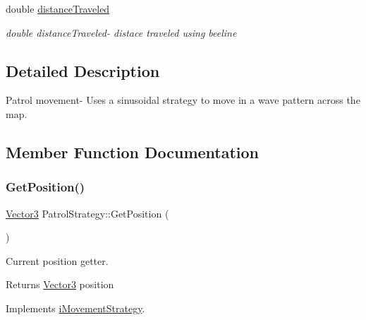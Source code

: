 \begin{DoxyCompactItemize}
\mbox{\label{classPatrolStrategy_a892db7d386688ed7d9351d393ae8855a}} 
double \hyperlink{classPatrolStrategy_a892db7d386688ed7d9351d393ae8855a}{distance\+Traveled}
\begin{DoxyCompactList}\small\item\em double distance\+Traveled-\/ distace traveled using beeline \end{DoxyCompactList}\end{DoxyCompactItemize}


\subsection{Detailed Description}
Patrol movement-\/ Uses a sinusoidal strategy to move in a wave pattern across the map. 

\subsection{Member Function Documentation}
\mbox{\label{classPatrolStrategy_a6feda4df5165aaae0cc7b82aed578c79}} 
\subsubsection{\texorpdfstring{Get\+Position()}{GetPosition()}}
{\footnotesize\ttfamily \hyperlink{classVector3}{Vector3} Patrol\+Strategy\+::\+Get\+Position (\begin{DoxyParamCaption}{ }\end{DoxyParamCaption})\hspace{0.3cm}{\ttfamily [virtual]}}



Current position getter. 

\begin{DoxyReturn}{Returns}
\hyperlink{classVector3}{Vector3} position 
\end{DoxyReturn}


Implements \hyperlink{classiMovementStrategy_aa9f5a07461c654a7497775696d20e990}{i\+Movement\+Strategy}.

\mbox{\label{classPatrolStrategy_ae5f750fd8d06de17eb1d6b49ee125011}} 
